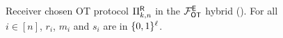 \begin{figure}
{
}
\vspace{-0.5cm}
	\caption{Receiver chosen OT protocol $\Pi^{\mathsf{R}}_{k,n}$ in the $\mathcal{F}_{\mathsf{OT}}^\mathsf{E}$ hybrid (). For all $i\in[n]$, $r_i$, $m_i$ and $s_i$ are in $\{0,1\}^\ell$.}
	\label{fig:protoRecvOT}
\end{figure}


